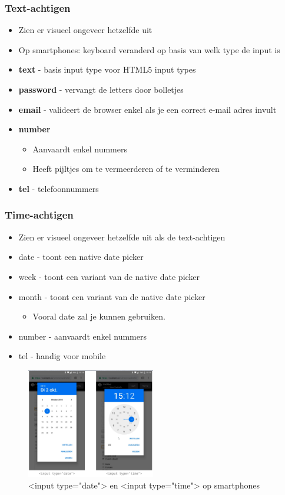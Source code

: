 \documentclass{article}
\newcommand{\bold}[1]{\textbf{#1}}
\begin{document}
\subsubsection{Text-achtigen}

\begin{itemize}
    \item Zien er visueel ongeveer hetzelfde uit
    \item Op smartphones: keyboard veranderd op basis van welk type de input is
    \item \bold{text} - basis input type voor HTML5 input types
    \item \bold{password} - vervangt de letters door bolletjes
    \item \bold{email} - valideert de browser enkel als je een correct e-mail adres invult
    \item \bold{number}
    \begin{itemize}
        \item Aanvaardt enkel nummers
        \item Heeft pijltjes om te vermeerderen of te verminderen
    \end{itemize}
    \item \bold{tel} - telefoonnummers
\end{itemize}

\subsubsection{Time-achtigen}

\begin{itemize}
    \item Zien er visueel ongeveer hetzelfde uit als de text-achtigen
    \item date - toont een native date picker
    \item week - toont een variant van de native date picker
    \item month - toont een variant van de native date picker
    \begin{itemize}
        \item Vooral date zal je kunnen gebruiken.
    \end{itemize}
    \item number - aanvaardt enkel nummers
    \item tel - handig voor mobile
\end{itemize}

\begin{figure}[H]
    \centering
    \includegraphics[width=0.5\textwidth]{input-date-time.png}
    \caption{<input type="date"> en <input type="time"> op smartphones}
\end{figure}
\end{document}
